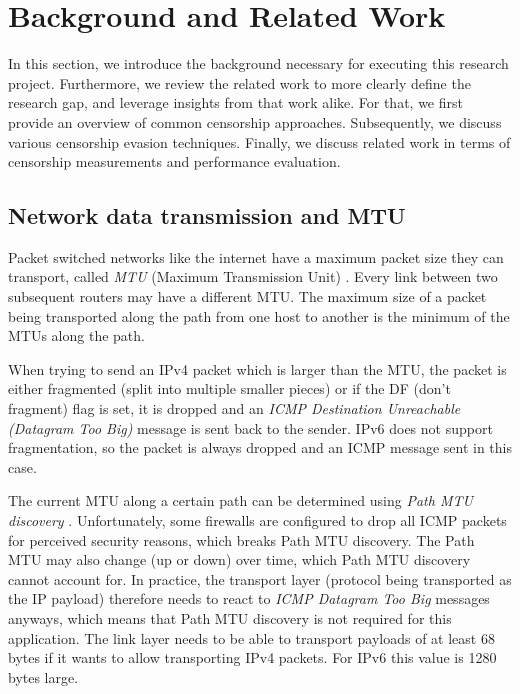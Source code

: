 
\chapter{Background and Related Work}
\label{chap:background}


In this section, we introduce the background necessary for executing this research project.
Furthermore, we review the related work to more clearly define the research gap, and leverage insights from that work alike.
For that, we first provide an overview of common censorship approaches.
Subsequently, we discuss various censorship evasion techniques.
Finally, we discuss related work in terms of censorship measurements and performance evaluation.

\section{Network data transmission and MTU}
Packet switched networks like the internet have a maximum packet size they can transport, called \textit{MTU} (Maximum Transmission Unit) \cite{wiki:Maximum_transmission_unit}.
Every link between two subsequent routers may have a different MTU.
The maximum size of a packet being transported along the path from one host to another is the minimum of the MTUs along the path.

When trying to send an IPv4 packet which is larger than the MTU, the packet is either fragmented (split into multiple smaller pieces) or if the DF (don't fragment) flag is set, it is dropped and an \textit{ICMP Destination Unreachable (Datagram Too Big)} message is sent back to the sender.
IPv6 does not support fragmentation, so the packet is always dropped and an ICMP message sent in this case.

The current MTU along a certain path can be determined using \textit{Path MTU discovery} \cite{wiki:Path_MTU_Discovery}.
Unfortunately, some firewalls are configured to drop all ICMP packets for perceived security reasons, which breaks Path MTU discovery.
The Path MTU may also change (up or down) over time, which Path MTU discovery cannot account for.
In practice, the transport layer (protocol being transported as the IP payload) therefore needs to react to \textit{ICMP Datagram Too Big} messages anyways, which means that Path MTU discovery is not required for this application.
The link layer needs to be able to transport payloads of at least 68 bytes if it wants to allow transporting IPv4 packets.
For IPv6 this value is 1280 bytes large.

